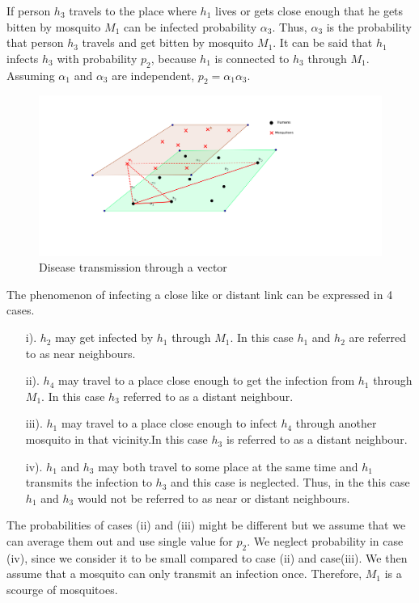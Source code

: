  If person $h_3$ travels to the place where $h_1$ lives or gets close enough that he gets bitten by mosquito $M_1$ can be infected probability $\alpha_3$. Thus, $\alpha_3$ is the probability that person $h_3$ travels and get bitten by mosquito $M_1$. It can be said that $h_1$ infects $h_3$ with probability $p_2$, because $h_1$ is connected to $h_3$ through $M_1$. Assuming $\alpha_1$ and $\alpha_3$ are independent, $p_2 = \alpha_1 \alpha_3$.
\begin{figure}[h!]
\centering
\includegraphics[scale=1]{images/human_mosquito.png}
\caption{Disease transmission through a vector} \label{fig5}
\end{figure}
The phenomenon of infecting a close like  or distant link can be expressed in 4 cases.


\begin{itemize}
\item[i).] $h_2$ may get infected by $h_1$ through $M_1$. In this case $h_1$ and $h_2$ are referred to as near neighbours.
\item[ii).] $h_4$ may travel to a place close enough to get the infection from $h_1$ through $M_1$. In this case $h_3$  referred to as a distant neighbour.
\item[iii).] $ h_1$ may travel to a place close enough to infect $h_4$  through another mosquito in that vicinity.In this case $h_3$ is  referred to as a distant neighbour.
\item[iv).] $h_1$  and $h_3$ may both travel to some place at the same time and $h_1$ transmits the infection to $h_3$ and this case is neglected. Thus, in the this case $h_1$ and $h_3$ would not be referred to as near or distant neighbours.
\end{itemize}

The probabilities of cases (ii) and (iii)
  might be different but we assume that we can average them out and   use single value for $p_2$. We neglect probability in case (iv), since we consider it to be small compared to case (ii) and case(iii). We then assume that a mosquito can only transmit an infection once. Therefore, $M_1$ is a scourge of mosquitoes.

